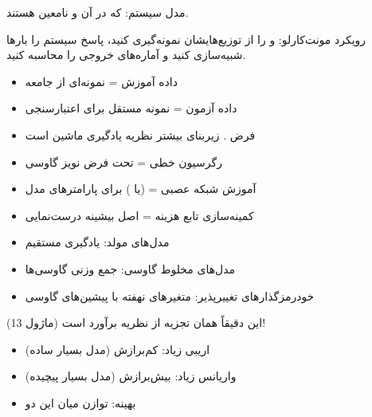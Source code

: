
مدل سیستم:  که در آن  و \lr{$\tau$} نامعین هستند.

رویکرد مونت‌کارلو:  و \lr{$\tau$} را از توزیع‌هایشان نمونه‌گیری کنید، پاسخ سیستم را بارها شبیه‌سازی کنید و آماره‌های خروجی را محاسبه کنید.



\begin{itemize}
\tightlist
\item
  داده آموزش = نمونه‌ای از جامعه
\item
  داده آزمون = نمونه مستقل برای اعتبارسنجی
\item
  فرض . زیربنای بیشتر نظریه یادگیری ماشین است
\end{itemize}


\begin{itemize}
\tightlist
\item
  رگرسیون خطی =  تحت فرض نویز گاوسی
\item
  آموزش شبکه عصبی =  (یا ) برای پارامترهای مدل
\item
  کمینه‌سازی تابع هزینه = اصل بیشینه درست‌نمایی
\end{itemize}


\begin{itemize}
\tightlist
\item
  مدل‌های مولد: یادگیری مستقیم 
\item
  مدل‌های مخلوط گاوسی: جمع وزنی گاوسی‌ها
\item
  خودرمزگذارهای تغییرپذیر: متغیرهای نهفته با پیشین‌های گاوسی
\end{itemize}



این دقیقاً همان تجزیه  از نظریه برآورد است (ماژول 13)!

\begin{itemize}
\tightlist
\item
  اریبی زیاد: کم‌برازش (مدل بسیار ساده)
\item
  واریانس زیاد: بیش‌برازش (مدل بسیار پیچیده)
\item
  بهینه: توازن میان این دو
\end{itemize}

